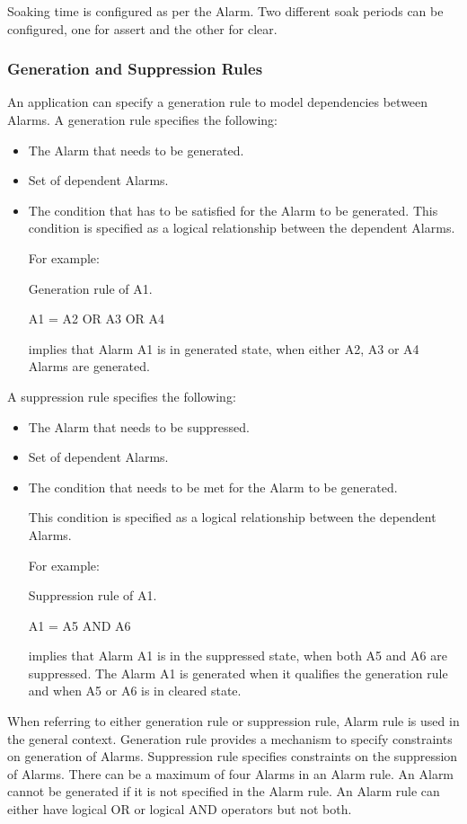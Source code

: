 \begin{flushleft}

Soaking time is configured as per the Alarm. Two different soak periods can be configured, one for assert and the other for clear. 
\newpage

\subsubsection{Generation and Suppression Rules}


An application can specify a generation rule to model dependencies between Alarms. A generation rule specifies the following:
\begin{itemize}
\item
The Alarm that needs to be generated.
\item
Set of dependent Alarms.
\item
The condition that has to be satisfied for the Alarm to be generated. This condition is specified as a logical relationship between the dependent Alarms.

For example:\par
	Generation rule of A1.\par
	A1 = A2 OR A3 OR A4\par
implies that Alarm A1 is in generated state, when either A2, A3 or A4 Alarms are generated. 
\end{itemize}

\par

A suppression rule specifies the following:
\begin{itemize}
\item
The Alarm that needs to be suppressed.
\item
Set of dependent Alarms.
\item
The condition that needs to be met for the Alarm to be generated.

This condition is specified as a logical relationship between the dependent Alarms.

For example: \par
	Suppression rule of A1.\par
	A1 = A5 AND A6\par
implies that Alarm A1 is in the suppressed state, when both A5 and A6 are suppressed. The Alarm A1 is generated when it qualifies the generation rule and 
when A5 or A6 is in cleared state.
\end{itemize}


When referring to either generation rule or suppression rule, Alarm rule is used in the general context. 
Generation rule provides a mechanism to specify constraints on generation of Alarms. Suppression rule specifies constraints on the suppression of  
Alarms. There can be a maximum of four Alarms in an Alarm rule. An Alarm cannot be generated 
if it is not specified in the Alarm rule. An Alarm rule can either have logical OR or logical AND operators but not both.

\end{flushleft}
